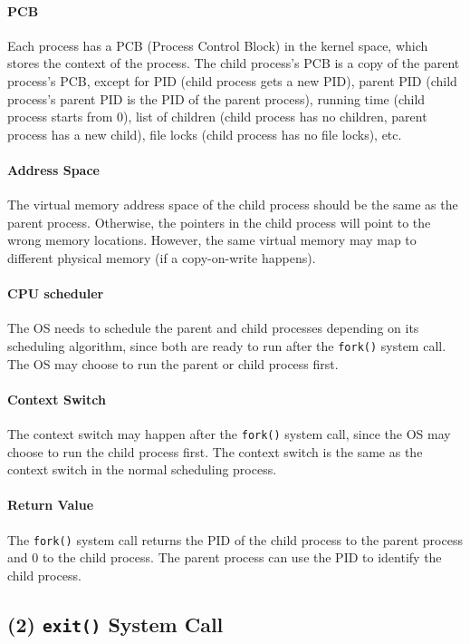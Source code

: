 \documentclass[a4paper,12pt]{article}
\begin{document}
\paragraph{PCB} Each process has a PCB (Process Control Block) in the kernel space, which stores the context of the process. The child process's PCB is a copy of the parent process's PCB, except for PID (child process gets a new PID), parent PID (child process's parent PID is the PID of the parent process), running time (child process starts from 0), list of children (child process has no children, parent process has a new child), file locks (child process has no file locks), etc.

\paragraph{Address Space} The virtual memory address space of the child process should be the same as the parent process. Otherwise, the pointers in the child process will point to the wrong memory locations. However, the same virtual memory may map to different physical memory (if a copy-on-write happens).

\paragraph{CPU scheduler} The OS needs to schedule the parent and child processes depending on its scheduling algorithm, since both are ready to run after the \texttt{fork()} system call. The OS may choose to run the parent or child process first.

\paragraph{Context Switch} The context switch may happen after the \texttt{fork()} system call, since the OS may choose to run the child process first. The context switch is the same as the context switch in the normal scheduling process.

\paragraph{Return Value} The \texttt{fork()} system call returns the PID of the child process to the parent process and 0 to the child process. The parent process can use the PID to identify the child process.

\subsection*{(2) \texttt{exit()} System Call}
\end{document}
